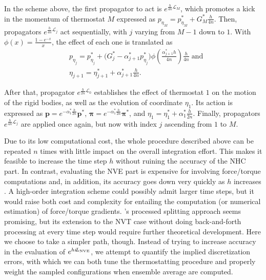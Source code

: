 \documentclass[
journal=jctcce,
layout=twocolumn
]{achemso}
\newcommand{\vt}[1]{\boldsymbol{\mathbf{#1}}}   %
\newcommand{\Liu}[1]{i\!L_\text{#1}}            %
\newcommand{\timestep}{h}
\begin{document}
In the scheme above, the first propagator to act is $e^{\frac{\timestep}{4n} \mathcal{L}_M}$, which promotes a kick in the momentum of thermostat $M$ expressed as $p_{\eta_M} = p_{\eta_M}^\ast + G_M^\ast \frac{\timestep}{4n}$.
Then, propagators $e^{\frac{\timestep}{4n} \mathcal{L}_j}$ act sequentially, with $j$ varying from $M-1$ down to $1$.
With $\phi(x) = \frac{1-e^{-x}}{x}$, the effect of each one is translated as \cite{Martyna_1996}
\begin{align*}
&p_{\eta_j} = p_{\eta_j}^\ast + \Big( G_j^\ast - \alpha_{j+1}^\ast p_{\eta_j}^\ast \Big) \phi\left(\frac{\alpha_{j+1}^\ast \timestep}{4n}\right) \frac{\timestep}{4n} \; \text{and} \\
&\eta_{j+1} = \eta_{j+1}^\ast + \alpha_{j+1}^\ast \frac{\timestep}{4n}.
\end{align*}

After that, propagator $e^{\frac{\timestep}{2n} \mathcal{L}_0}$ establishes the effect of thermostat $1$ on the motion of the rigid bodies, as well as the evolution of coordinate $\eta_1$.
Its action is expressed as ${\vt p} = e^{-\alpha_1^\ast \frac{\timestep}{2n}} {\vt p}^\ast$, ${\vt \pi} = e^{-\alpha_1^\ast \frac{\timestep}{2n}} {\vt \pi}^\ast$, and $\eta_1 = \eta_1^\ast + \alpha_1^\ast \frac{\timestep}{2n}$.
Finally, propagators $e^{\frac{\timestep}{4n} \mathcal{L}_j}$ are applied once again, but now with index $j$ ascending from $1$ to $M$.

Due to its low computational cost, the whole procedure described above can be repeated $n$ times with little impact on the overall integration effort.
This makes it feasible to increase the time step $\timestep$ without ruining the accuracy of the NHC part.
In contrast, evaluating the NVE part is expensive for involving force/torque computations and, in addition, its accuracy goes down very quickly as $\timestep$ increases \cite{Davidchack_2010, Silveira_2017}.
A high-order integration scheme\cite{Omelyan_2007, Van_zon_2008} could possibly admit larger time steps, but it would raise both cost and complexity for entailing the computation (or numerical estimation) of force/torque gradients.
\citeauthor{Omelyan_2008}'s processed splitting approach \cite{Omelyan_2008} seems promising, but its extension to the NVT case without doing back-and-forth processing at every time step would require further theoretical development.
Here we choose to take a simpler path, though.
Instead of trying to increase accuracy in the evaluation of $e^{\timestep \Liu{\tiny NVE}}$, we attempt to quantify the implied discretization errors, with which we can both tune the thermostatting procedure and properly weight the sampled configurations when ensemble average are computed.
\end{document}
